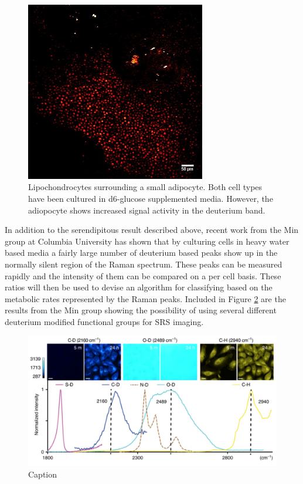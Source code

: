 \begin{figure}[h]
    \centering
    \includegraphics[width=0.7\textwidth]{Figures/twocell.jpg}
    \caption{Lipochondrocytes surrounding a small adipocyte.  Both cell types have been cultured in d6-glucose supplemented media.  However, the adiopocyte shows increased signal activity in the deuterium band.}
    \label{fig:twocell}
\end{figure}

In addition to the serendipitous result described above, recent work from the Min group at Columbia University has shown that by culturing cells in heavy water based media a fairly large number of deuterium based peaks show up in the normally silent region of the Raman spectrum.  These peaks can be measured rapidly and the intensity of them can be compared on a per cell basis. These ratios will then be used to devise an algorithm for classifying based on the metabolic rates represented by the Raman peaks.  Included in Figure \ref{fig:ming} are the results from the Min group showing the possibility of using several different deuterium modified functional groups for SRS imaging.~\cite{Shi:2018aa}

\begin{figure}[h]
    \centering
    \includegraphics[width=\linewidth]{Figures/mingraph.png}
    \caption{Caption}
    \label{fig:ming}
\end{figure}

